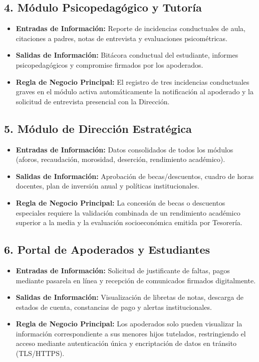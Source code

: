 \documentclass[12pt,a4paper,oneside]{report}
\begin{document}
\subsection{4. Módulo Psicopedagógico y Tutoría}
\begin{itemize}
    \item \textbf{Entradas de Información:} Reporte de incidencias conductuales de aula, citaciones a padres, notas de entrevista y evaluaciones psicométricas.
    \item \textbf{Salidas de Información:} Bitácora conductual del estudiante, informes psicopedagógicos y compromise firmados por los apoderados.
    \item \textbf{Regla de Negocio Principal:} El registro de tres incidencias conductuales graves en el módulo activa automáticamente la notificación al apoderado y la solicitud de entrevista presencial con la Dirección.
\end{itemize}

\subsection{5. Módulo de Dirección Estratégica}
\begin{itemize}
    \item \textbf{Entradas de Información:} Datos consolidados de todos los módulos (aforos, recaudación, morosidad, deserción, rendimiento académico).
    \item \textbf{Salidas de Información:} Aprobación de becas/descuentos, cuadro de horas docentes, plan de inversión anual y políticas institucionales.
    \item \textbf{Regla de Negocio Principal:} La concesión de becas o descuentos especiales requiere la validación combinada de un rendimiento académico superior a la media y la evaluación socioeconómica emitida por Tesorería.
\end{itemize}

\subsection{6. Portal de Apoderados y Estudiantes}
\begin{itemize}
    \item \textbf{Entradas de Información:} Solicitud de justificante de faltas, pagos mediante pasarela en línea y recepción de comunicados firmados digitalmente.
    \item \textbf{Salidas de Información:} Visualización de libretas de notas, descarga de estados de cuenta, constancias de pago y alertas institucionales.
    \item \textbf{Regla de Negocio Principal:} Los apoderados solo pueden visualizar la información correspondiente a sus menores hijos tutelados, restringiendo el acceso mediante autenticación única y encriptación de datos en tránsito (TLS/HTTPS).
\end{itemize}
\end{document}
